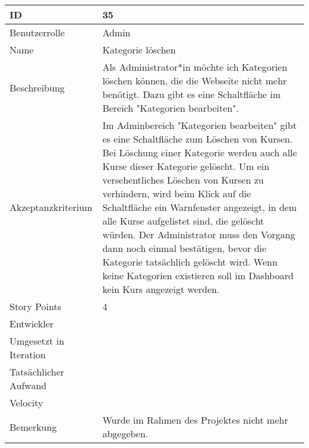 \begin{tabularx}{\textwidth}{|p{}|X|}
	\hline
	ID & 35\\
	\hline
	Benutzerrolle & Admin\\
	\hline
	Name & Kategorie löschen\\
	\hline
	Beschreibung & Als Administrator*in möchte ich Kategorien löschen können, die die Webseite nicht mehr benötigt. Dazu gibt es eine Schaltfläche im Bereich "Kategorien bearbeiten".\\
	\hline
	Akzeptanzkriterium & Im Adminbereich "Kategorien bearbeiten" gibt es eine Schaltfläche zum Löschen von Kursen. Bei Löschung einer Kategorie werden auch alle Kurse dieser Kategorie gelöscht. Um ein versehentliches Löschen von Kursen zu verhindern, wird beim Klick auf die Schaltfläche ein Warnfenster angezeigt, in dem alle Kurse aufgelistet sind, die gelöscht würden. Der Administrator muss den Vorgang dann noch einmal bestätigen, bevor die Kategorie tatsächlich gelöscht wird.  Wenn keine Kategorien existieren soll im Dashboard kein Kurs angezeigt werden.\\
	\hline
	Story Points & 4 \\
	\hline
	Entwickler & \\
	\hline
	Umgesetzt in Iteration & \\
	\hline
	Tatsächlicher Aufwand & \\
	\hline
	Velocity & \\
	\hline
	Bemerkung & Wurde im Rahmen des Projektes nicht mehr abgegeben.\\
	\hline
\end{tabularx}
\vspace{20pt}
